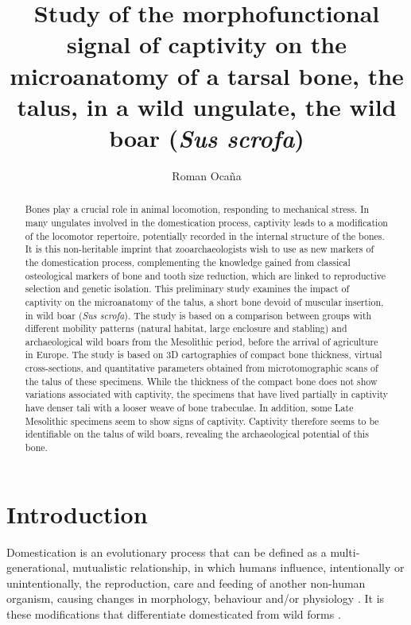 \documentclass[12pt,a4paper]{article}
\title{Study of the morphofunctional signal of captivity on the microanatomy of a tarsal bone, the talus, in a wild ungulate, the wild boar (\textit{Sus scrofa})}
\author{Roman Ocaña}
\begin{document}
\maketitle
\tableofcontents
\setcounter{tocdepth}{6}

\begin{abstract}
    Bones play a crucial role in animal locomotion, responding to mechanical stress. In
many ungulates involved in the domestication process, captivity leads to a modification of the
locomotor repertoire, potentially recorded in the internal structure of the bones. It is this non-heritable imprint that zooarchaeologists wish to use as new markers of the domestication
process, complementing the knowledge gained from classical osteological markers of bone
and tooth size reduction, which are linked to reproductive selection and genetic isolation. This
preliminary study examines the impact of captivity on the microanatomy of the talus, a short
bone devoid of muscular insertion, in wild boar (\textit{Sus scrofa}). The study is based on a comparison between groups with different mobility patterns (natural habitat, large enclosure and stabling) and archaeological wild boars from the Mesolithic period, before the arrival of agriculture in Europe. The study is based on 3D cartographies of compact bone thickness, virtual cross-sections, and quantitative parameters obtained from microtomographic scans of the talus of these specimens. While the thickness of the compact bone does not show variations
associated with captivity, the specimens that have lived partially in captivity
have denser tali with a looser weave of bone trabeculae. In addition, some Late Mesolithic
specimens seem to show signs of captivity. Captivity therefore seems to be identifiable on the
talus of wild boars, revealing the archaeological potential of this bone.
\end{abstract}

\section{Introduction}
Domestication is an evolutionary process that can be defined as a multi-generational, mutualistic relationship, in which humans influence, intentionally or unintentionally, the reproduction, care and feeding of another non-human organism, causing changes in morphology, behaviour and/or physiology \cite{axelssonGenomicSignatureDog2013, kunzlWildMammalKept2003d, vigneOriginsAnimalDomestication2011d}. It is these modifications that differentiate domesticated from wild forms \cite{evinTestPaedomorphismDomestic2017r,zederPathwaysAnimalDomestication2012}.
\end{document}
